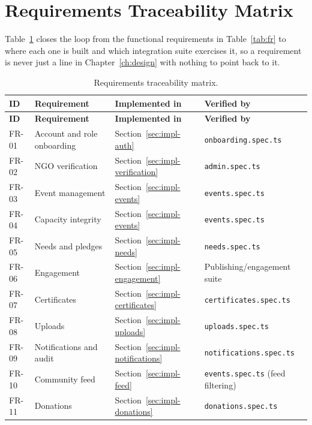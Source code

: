 \section{Requirements Traceability Matrix}
\label{sec:traceability}
Table~\ref{tab:traceability} closes the loop from the functional requirements in Table~\ref{tab:fr} to where each one is built and which integration suite exercises it, so a requirement is never just a line in Chapter~\ref{ch:design} with nothing to point back to it.

\begin{longtable}{|p{}|p{}|p{}|p{}|}
\caption{Requirements traceability matrix.}\label{tab:traceability}\\\hline
\textbf{ID} & \textbf{Requirement} & \textbf{Implemented in} & \textbf{Verified by}\\\hline
\endfirsthead
\hline
\textbf{ID} & \textbf{Requirement} & \textbf{Implemented in} & \textbf{Verified by}\\\hline
\endhead
FR-01 & Account and role onboarding & Section~\ref{sec:impl-auth} & \texttt{onboarding.spec.ts}\\\hline
FR-02 & NGO verification & Section~\ref{sec:impl-verification} & \texttt{admin.spec.ts}\\\hline
FR-03 & Event management & Section~\ref{sec:impl-events} & \texttt{events.spec.ts}\\\hline
FR-04 & Capacity integrity & Section~\ref{sec:impl-events} & \texttt{events.spec.ts}\\\hline
FR-05 & Needs and pledges & Section~\ref{sec:impl-needs} & \texttt{needs.spec.ts}\\\hline
FR-06 & Engagement & Section~\ref{sec:impl-engagement} & Publishing/engagement suite\\\hline
FR-07 & Certificates & Section~\ref{sec:impl-certificates} & \texttt{certificates.spec.ts}\\\hline
FR-08 & Uploads & Section~\ref{sec:impl-uploads} & \texttt{uploads.spec.ts}\\\hline
FR-09 & Notifications and audit & Section~\ref{sec:impl-notifications} & \texttt{notifications.spec.ts}\\\hline
FR-10 & Community feed & Section~\ref{sec:impl-feed} & \texttt{events.spec.ts} (feed filtering)\\\hline
FR-11 & Donations & Section~\ref{sec:impl-donations} & \texttt{donations.spec.ts}\\\hline
\end{longtable}

